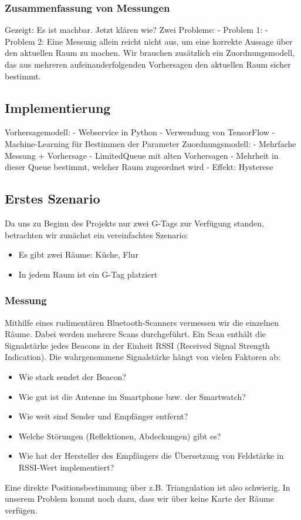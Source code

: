 \subsubsection{Zusammenfassung von Messungen}
Gezeigt: Es ist machbar. Jetzt klären wie?
Zwei Probleme:
- Problem 1: 
- Problem 2: Eine Messung allein reicht nicht aus, um eine korrekte Aussage über
  den aktuellen Raum zu machen. Wir brauchen zusätzlich ein Zuordnungsmodell,
  das aus mehreren aufeinanderfolgenden Vorhersagen den aktuellen Raum sicher
  bestimmt.
  
\subsection{Implementierung}

Vorhersagemodell:
- Webservice in Python
- Verwendung von TensorFlow
- Machine-Learning für Bestimmen der Parameter
Zuordnungsmodell:
- Mehrfache Messung + Vorhersage
- LimitedQueue mit alten Vorhersagen
- Mehrheit in dieser Queue bestimmt, welcher Raum zugeordnet wird
- Effekt: Hysterese

\subsection{Erstes Szenario}

Da uns zu Beginn des Projekts nur zwei G-Tags zur Verfügung standen, betrachten
wir zunächst ein vereinfachtes Szenario:
\begin{itemize}
	\item Es gibt zwei Räume: Küche, Flur
	\item In jedem Raum ist ein G-Tag platziert
\end{itemize}

\subsubsection{Messung}

Mithilfe eines rudimentären Bluetooth-Scanners vermessen wir die einzelnen Räume.
Dabei werden mehrere Scans durchgeführt. Ein Scan enthält die Signalstärke 
jedes Beacons in der Einheit RSSI (Received Signal Strength Indication).
Die wahrgenommene Signalstärke hängt von vielen Faktoren ab:
\begin{itemize}
	\item Wie stark sendet der Beacon?
	\item Wie gut ist die Antenne im Smartphone bzw. der Smartwatch?
	\item Wie weit sind Sender und Empfänger entfernt?
	\item Welche Störungen (Reflektionen, Abdeckungen) gibt es?
	\item Wie hat der Hersteller des Empfängers die Übersetzung von Feldstärke in RSSI-Wert implementiert?
\end{itemize}
Eine direkte Positionsbestimmung über z.B. Triangulation ist also schwierig.
In unserem Problem kommt noch dazu, dass wir über keine Karte der Räume
verfügen.

